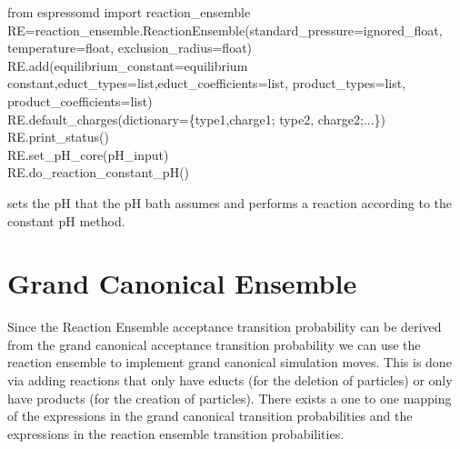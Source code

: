   \begin{pysyntax}
  	from espressomd import reaction_ensemble \\
  	RE=reaction_ensemble.ReactionEnsemble(standard_pressure=ignored_float, temperature=float, exclusion_radius=float) \\
  	RE.add(equilibrium_constant=equilibrium constant,educt_types=list,educt_coefficients=list, product_types=list, product_coefficients=list) \\
  	RE.default_charges(dictionary=\{type1,charge1; type2, charge2;...\}) \\
	RE.print_status() \\
	 RE.set_pH_core(pH_input) \\
	 RE.do_reaction_constant_pH() 
	\begin{features}
	\end{features}
\end{pysyntax}


 sets the pH that the pH bath assumes and  performs a reaction according to the constant pH method.


\section{Grand Canonical Ensemble}
Since the Reaction Ensemble acceptance transition probability can be derived from the grand canonical acceptance transition probability we can use the reaction ensemble to implement grand canonical simulation moves. This is done via adding reactions that only have educts (for the deletion of particles) or only have products (for the creation of particles). There exists a one to one mapping of the expressions in the grand canonical transition probabilities and the expressions in the reaction ensemble transition probabilities.
